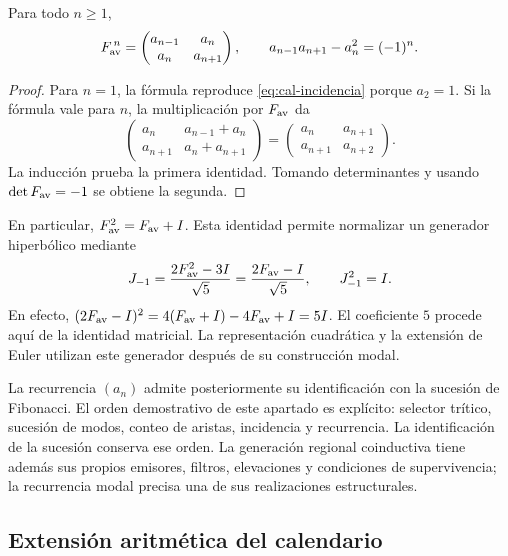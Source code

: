\begin{proposicion}
\label{prop:cal-potencias}
Para todo $n\geq1$,
\[
 F_{\rm av}^{\,n}=
 \begin{pmatrix}a_{n-1}&a_n\\a_n&a_{n+1}\end{pmatrix},
 \qquad
 a_{n-1}a_{n+1}-a_n^2=(-1)^n.
\]
\end{proposicion}
\begin{proof}
Para $n=1$, la fórmula reproduce \eqref{eq:cal-incidencia} porque
$a_2=1$. Si la fórmula vale para $n$, la multiplicación por $F_{\rm av}$
da
\[
 \begin{pmatrix}
 a_n&a_{n-1}+a_n\\a_{n+1}&a_n+a_{n+1}
 \end{pmatrix}
 =\begin{pmatrix}a_n&a_{n+1}\\a_{n+1}&a_{n+2}\end{pmatrix}.
\]
La inducción prueba la primera identidad. Tomando determinantes y usando
$\det F_{\rm av}=-1$ se obtiene la segunda.
\end{proof}

En particular, $F_{\rm av}^{2}=F_{\rm av}+I$. Esta identidad permite
normalizar un generador hiperbólico mediante
\begin{equation}
 J_{-1}=\frac{2F_{\rm av}^{2}-3I}{\sqrt5}
       =\frac{2F_{\rm av}-I}{\sqrt5},
 \qquad J_{-1}^{2}=I.
 \label{eq:cal-generador-hiperbolico}
\end{equation}
En efecto, $(2F_{\rm av}-I)^2=4(F_{\rm av}+I)-4F_{\rm av}+I=5I$.
El coeficiente $5$ procede aquí de la identidad matricial. La representación
cuadrática y la extensión de Euler utilizan este generador después de su
construcción modal.

La recurrencia $(a_n)$ admite posteriormente su identificación con la
sucesión de Fibonacci. El orden demostrativo de este apartado es explícito:
selector trítico, sucesión de modos, conteo de aristas, incidencia y
recurrencia. La identificación de la sucesión conserva ese orden. La
generación regional coinductiva tiene además sus propios emisores, filtros,
elevaciones y condiciones de supervivencia; la recurrencia modal precisa
una de sus realizaciones estructurales.

\subsection{Extensión aritmética del calendario}

